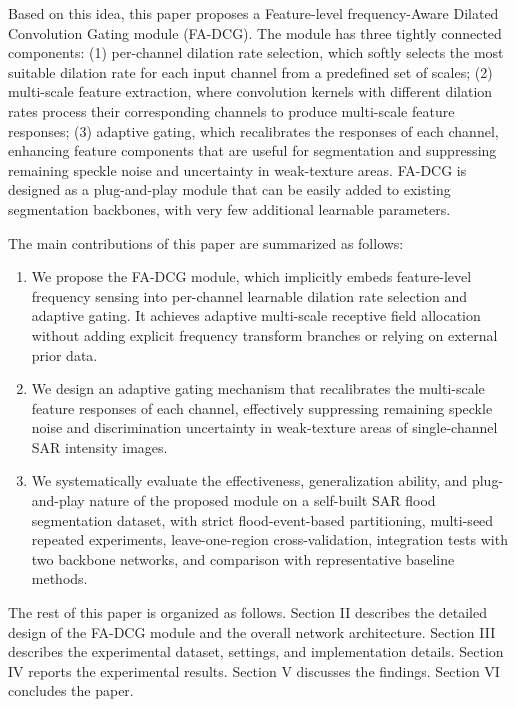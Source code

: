 \documentclass[lettersize,journal]{IEEEtran}
\begin{document}
Based on this idea, this paper proposes a Feature-level frequency-Aware Dilated Convolution Gating module (FA-DCG). The module has three tightly connected components: (1) per-channel dilation rate selection, which softly selects the most suitable dilation rate for each input channel from a predefined set of scales; (2) multi-scale feature extraction, where convolution kernels with different dilation rates process their corresponding channels to produce multi-scale feature responses; (3) adaptive gating, which recalibrates the responses of each channel, enhancing feature components that are useful for segmentation and suppressing remaining speckle noise and uncertainty in weak-texture areas. FA-DCG is designed as a plug-and-play module that can be easily added to existing segmentation backbones, with very few additional learnable parameters.

The main contributions of this paper are summarized as follows:
\begin{enumerate}
\item We propose the FA-DCG module, which implicitly embeds feature-level frequency sensing into per-channel learnable dilation rate selection and adaptive gating. It achieves adaptive multi-scale receptive field allocation without adding explicit frequency transform branches or relying on external prior data.
\item We design an adaptive gating mechanism that recalibrates the multi-scale feature responses of each channel, effectively suppressing remaining speckle noise and discrimination uncertainty in weak-texture areas of single-channel SAR intensity images.
\item We systematically evaluate the effectiveness, generalization ability, and plug-and-play nature of the proposed module on a self-built SAR flood segmentation dataset, with strict flood-event-based partitioning, multi-seed repeated experiments, leave-one-region cross-validation, integration tests with two backbone networks, and comparison with representative baseline methods.
\end{enumerate}

The rest of this paper is organized as follows. Section II describes the detailed design of the FA-DCG module and the overall network architecture. Section III describes the experimental dataset, settings, and implementation details. Section IV reports the experimental results. Section V discusses the findings. Section VI concludes the paper.
\end{document}
